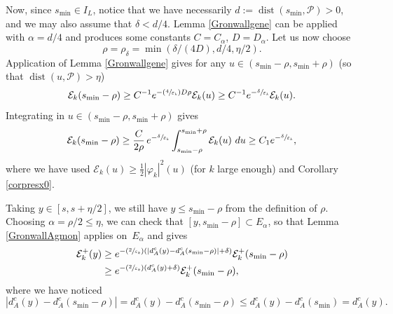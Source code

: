 \documentclass[11pt]{article}
\numberwithin{equation}{section}
\newcommand{\Psfrac}[2]{(\sfrac{#1}{#2})}
\theoremstyle{definition}
\newcommand{\Ek}{\mathcal{E}_k}
\DeclareMathOperator{\dist}{dist}
\newcommand{\ce}{c}
\let\e\varepsilon
\begin{document}
Now, since $s_{\min} \in I_L$, notice that we have necessarily $d:=\dist(s_{\min},\mathcal{P})>0$, and we may also assume that $\delta<d/4$.
Lemma \ref{Gronwallgene} can be applied with $\alpha=d/4$ and produces some constants $C=C_{\alpha}$, $D=D_{\alpha}$. Let us now choose
\[
\rho=\rho_{\delta}=\min(\delta/(4D),d/4, \eta/2).
\]
Application of Lemma \ref{Gronwallgene} gives for any $u\in (s_{\min}-\rho,s_{\min}+\rho) $ (so that $\dist(u,\mathcal{P})>\eta$)
\[
\Ek(s_{\min}-\rho)\geq C^{-1}e^{-\Psfrac{4}{\e_k}D\rho}\Ek(u)\geq C^{-1}e^{-\sfrac{\delta}{\e_k}}\Ek(u).
\]
Integrating in $u\in (s_{\min}-\rho,s_{\min}+\rho) $ gives
\begin{equation}
\label{inegEk}
\Ek(s_{\min}-\rho)\geq \frac{C}{2\rho}\,e^{-\sfrac{\delta}{\e_k}}\int_{s_{\min}-\rho}^{s_{\min}+\rho} \Ek(u)~du \geq C_1e^{-\sfrac{\delta}{\e_k}},
\end{equation}
where we have used $\Ek(u)\geq \frac12 |\varphi_k|^2(u)$ (for $k$ large enough) and Corollary \ref{corpresx0}.

Taking $y\in [s,s+\eta/2]$, we still have $y\leq s_{\min}-\rho$ from the definition of $\rho$. Choosing $\alpha=\rho/2\leq \eta$, we can check that $[y,s_{\min}-\rho]\subset E_{\alpha}$, so that Lemma \ref{GronwallAgmon} applies on~$E_{\alpha}$ and gives
\begin{equation}
\label{inegdaeta}
\begin{split}
\Ek^+(y)&\geq e^{ -\Psfrac{2}{\e_k}\left(|d_A^{\ce}(y)-d_A^{\ce}(s_{\min}-\rho)|+\delta\right)}\Ek^+(s_{\min}-\rho)\\
&\geq e^{-\Psfrac{2}{\e_k}\left(d_A^{\ce}(y)+\delta\right)}\Ek^+(s_{\min}-\rho),
\end{split}
\end{equation}
where we have noticed
\[
|d_A^{\ce}(y)-d_A^{\ce}(s_{\min}-\rho)|= d_A^{\ce}(y)-d_A^{\ce}(s_{\min}-\rho) \leq d_A^{\ce}(y)-d_A^{\ce}(s_{\min}) = d_A^{\ce}(y).
\]
\end{document}
